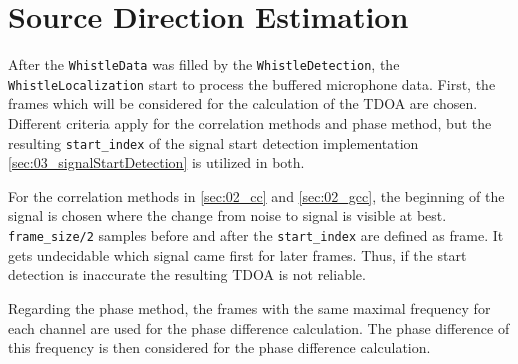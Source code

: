 \section{Source Direction Estimation}
\label{sec:03_direction}

After the \lstinline!WhistleData! was filled by the \lstinline!WhistleDetection!,
the \lstinline!WhistleLocalization! start to process the buffered microphone data.
First, the frames which will be considered for the calculation of the \ac{TDOA}
are chosen.
Different criteria apply for the correlation methods and phase method, but the
resulting \lstinline!start_index! of the signal start detection implementation
\cref{sec:03_signalStartDetection} is utilized in both.

For the correlation methods in \cref{sec:02_cc} and \cref{sec:02_gcc}, the beginning
of the signal is chosen where the change from noise to signal is visible at best.
\lstinline!frame_size/2! samples before and after the \lstinline!start_index! are defined
as frame.
It gets undecidable which signal came first for later frames. Thus, if the start detection
is inaccurate the resulting \ac{TDOA} is not reliable.

Regarding the phase method,
the frames with the same maximal frequency for each channel are used for the
phase difference calculation.
The phase difference of this frequency is then considered for the phase difference
calculation. %

